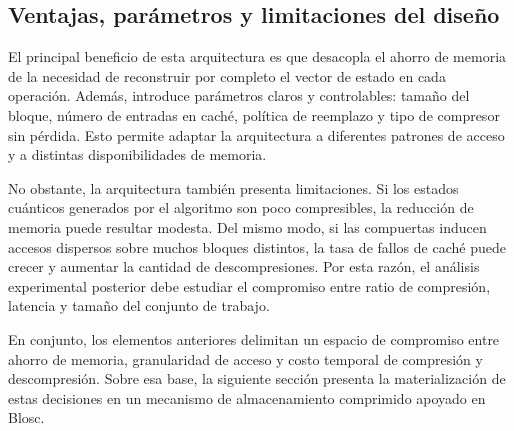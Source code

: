 \subsection{Ventajas, parámetros y limitaciones del diseño}

El principal beneficio de esta arquitectura es que desacopla el ahorro de memoria de la necesidad de reconstruir por completo el vector de estado en
cada operación. Además, introduce parámetros claros y controlables: tamaño del bloque, número de entradas en caché, política de reemplazo y tipo de
compresor sin pérdida. Esto permite adaptar la arquitectura a diferentes patrones de acceso y a distintas disponibilidades de memoria.

No obstante, la arquitectura también presenta limitaciones. Si los estados cuánticos generados por el algoritmo son poco compresibles, la reducción
de memoria puede resultar modesta. Del mismo modo, si las compuertas inducen accesos dispersos sobre muchos bloques distintos, la tasa de fallos de
caché puede crecer y aumentar la cantidad de descompresiones. Por esta razón, el análisis experimental posterior debe estudiar el compromiso entre
ratio de compresión, latencia y tamaño del conjunto de trabajo.

En conjunto, los elementos anteriores delimitan un espacio de compromiso entre ahorro de
memoria, granularidad de acceso y costo temporal de compresión y descompresión. Sobre esa
base, la siguiente sección presenta la materialización de estas decisiones en un mecanismo de
almacenamiento comprimido apoyado en Blosc.
